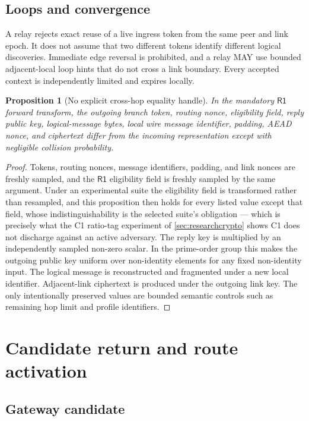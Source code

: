 \documentclass[11pt,oneside]{article}
\newcommand{\Rone}{\ensuremath{\mathsf{R1}}}
\newtheorem{proposition}{Proposition}
\begin{document}
\subsection{Loops and convergence}

A relay rejects exact reuse of a live ingress token from the same peer and link epoch. It does not assume that two different tokens identify different logical discoveries. Immediate edge reversal is prohibited, and a relay MAY use bounded adjacent-local loop hints that do not cross a link boundary. Every accepted context is independently limited and expires locally.

\begin{proposition}[No explicit cross-hop equality handle]
In the mandatory \Rone{} forward transform, the outgoing branch token, routing nonce, eligibility field, reply public key, logical-message bytes, local wire message identifier, padding, AEAD nonce, and ciphertext differ from the incoming representation except with negligible collision probability.
\end{proposition}

\begin{proof}
Tokens, routing nonces, message identifiers, padding, and link nonces are freshly sampled, and the \Rone{} eligibility field is freshly sampled by the same argument. Under an experimental suite the eligibility field is transformed rather than resampled, and this proposition then holds for every listed value except that field, whose indistinguishability is the selected suite's obligation --- which is precisely what the C1 ratio-tag experiment of \cref{sec:researchcrypto} shows C1 does not discharge against an active adversary. The reply key is multiplied by an independently sampled non-zero scalar. In the prime-order group this makes the outgoing public key uniform over non-identity elements for any fixed non-identity input. The logical message is reconstructed and fragmented under a new local identifier. Adjacent-link ciphertext is produced under the outgoing link key. The only intentionally preserved values are bounded semantic controls such as remaining hop limit and profile identifiers.
\end{proof}

\section{Candidate return and route activation}
\label{sec:reverse}

\subsection{Gateway candidate}
\end{document}
